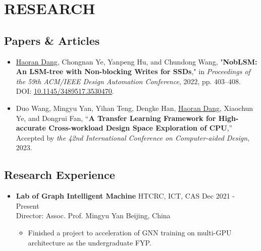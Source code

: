 \documentclass[a4paper,10pt]{ctexart} %
\begin{document}

\section{RESEARCH}

    \subsection{Papers \& Articles}

        \begin{itemize}
            \item \underline{Haoran Dang}, Chongnan Ye, Yanpeng Hu, and Chundong Wang, "\textbf{NobLSM: An LSM-tree with Non-blocking Writes for SSDs}," in \textit{Proceedings of the 59th ACM/IEEE Design Automation Conference}, 2022, pp. 403–408. DOI: \href{https://doi.org/10.1145/3489517.3530470}{10.1145/3489517.3530470}.
            \item Duo Wang, Mingyu Yan, Yihan Teng, Dengke Han, \underline{Haoran Dang}, Xiaochun Ye, and Dongrui Fan, “\textbf{A Transfer Learning Framework for High-accurate Cross-workload Design Space Exploration of CPU},” Accepted by \textit{the 42nd International Conference on Computer-aided Design}, 2023.
        \end{itemize}

    \subsection{Research Experience}

    \begin{itemize}
        \item \textbf{Lab of Graph Intelligent Machine} \quad HTCRC, ICT, CAS \hfill Dec 2021 - Present \\
        {\small Director: Assoc. Prof. Mingyu Yan} \hfill Beijing, China
        \begin{small}
            \begin{itemize}
                \item Finished a project to acceleration of GNN training on multi-GPU architecture as the undergraduate FYP.
            \end{itemize}
        \end{small}
    \end{itemize}
\end{document}
